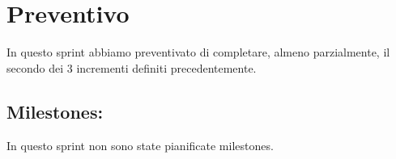 \section{Preventivo}

In questo sprint abbiamo preventivato di completare, almeno parzialmente, il secondo dei 3 incrementi definiti precedentemente.

\subsection{Milestones:}  

In questo sprint non sono state pianificate milestones.